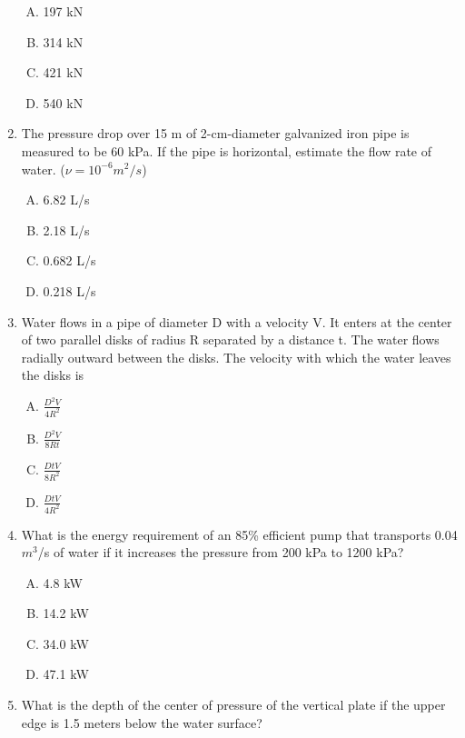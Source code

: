 \documentclass[12pt]{article}
\begin{document}
\begin{enumerate}
\begin{enumerate}[A)]
\item 197 kN
\item 314 kN 
\item 421 kN
\item 540 kN
\end{enumerate}
\clearpage

\item The pressure drop over 15 m of 2-cm-diameter galvanized iron pipe is measured
to be 60 kPa. If the pipe is horizontal, estimate the flow rate of water. ($\nu = 10^{-6}
m^2/s$)
\begin{enumerate}[A)]
\item 6.82 L/s
\item 2.18 L/s
\item 0.682 L/s
\item 0.218 L/s
\end{enumerate}

\item Water flows in a pipe of diameter D with a velocity V. It enters at the center of
two parallel disks of radius R separated by a distance t. The water flows radially
outward between the disks. The velocity with which the water leaves the disks is

\begin{enumerate}[A)]
\item $\frac{D^2V}{4R^2}$
\item $\frac{D^2V}{8Rt}$
\item $\frac{DtV}{8R^2}$
\item $\frac{DtV}{4R^2}$
\end{enumerate}

\item What is the energy requirement of an 85\% efficient pump that transports 0.04
$m^3$/s of water if it increases the pressure from 200 kPa to 1200 kPa?
\begin{enumerate}[A)]
\item 4.8 kW
\item 14.2 kW
\item 34.0 kW
\item 47.1 kW
\end{enumerate}
\clearpage

\item What is the depth of the center of pressure of the vertical plate if the upper edge is 1.5 meters below the water surface?


\end{enumerate}
\end{document}
